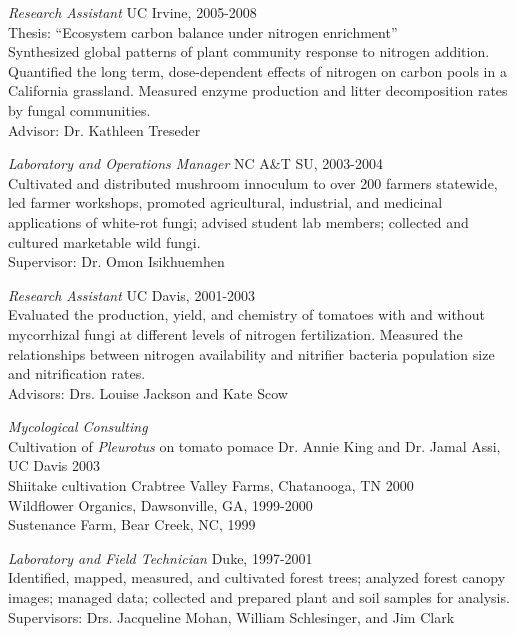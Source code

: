 \documentclass[line,10pt]{res}
\begin{document}
\begin{resume}
               {\sl  Research Assistant} \hfill UC Irvine, 2005-2008 \\
 Thesis: ``Ecosystem carbon balance under nitrogen enrichment''\\
                Synthesized global patterns of plant community response to nitrogen addition. Quantified the long term, dose-dependent effects of nitrogen on carbon pools in a California grassland. Measured enzyme production and litter decomposition rates by fungal communities. \\Advisor: Dr. Kathleen Treseder
              
                {\sl Laboratory and Operations Manager} \hfill NC A\&T SU, 2003-2004 \\
                 Cultivated and distributed mushroom innoculum to over 200 farmers statewide, led farmer workshops, promoted agricultural, industrial, and medicinal applications of white-rot fungi; advised student lab members; collected and cultured marketable wild fungi. \\Supervisor: Dr. Omon Isikhuemhen

               {\sl  Research Assistant} \hfill UC Davis, 2001-2003 \\
   Evaluated the production, yield, and chemistry of tomatoes with and without mycorrhizal fungi at different levels of nitrogen fertilization. Measured the relationships between nitrogen availability and nitrifier bacteria population size and nitrification rates. \\Advisors: Drs. Louise Jackson and  Kate Scow
                 
                {\sl Mycological Consulting}  \\
                 Cultivation of \textit{Pleurotus} on tomato pomace \hfill Dr. Annie King and Dr. Jamal Assi, UC Davis 2003\\ Shiitake cultivation \hfill Crabtree Valley Farms, Chatanooga, TN 2000\\ \phantom{} \hfill Wildflower Organics, Dawsonville, GA, 1999-2000 \\ \phantom{} \hfill Sustenance Farm, Bear Creek, NC, 1999

                 {\sl Laboratory and Field Technician} \hfill  Duke, 1997-2001\\
 Identified, mapped, measured, and cultivated forest trees; analyzed forest canopy images; managed data; collected and prepared plant and soil samples for analysis. \\Supervisors: Drs. Jacqueline Mohan, William Schlesinger, and Jim Clark


\end{resume}
\end{document}
